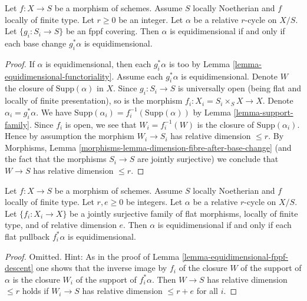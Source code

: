 \begin{lemma}
\label{lemma-equidimensional-fppf-descent}
Let $f : X \to S$ be a morphism of schemes. Assume $S$ locally Noetherian
and $f$ locally of finite type. Let $r \geq 0$ be an integer. Let $\alpha$
be a relative $r$-cycle on $X/S$. Let $\{g_i : S_i \to S\}$
be an fppf covering. Then $\alpha$ is equidimensional
if and only if each base change $g_i^*\alpha$ is equidimensional.
\end{lemma}

\begin{proof}
If $\alpha$ is equidimensional, then each $g_i^*\alpha$ is too by
Lemma \ref{lemma-equidimensional-functoriality}. Assume each $g_i^*\alpha$
is equidimensional. Denote $W$ the closure
of $\text{Supp}(\alpha)$ in $X$. Since $g_i : S_i \to S$ is universally open
(being flat and locally of finite presentation), so is the morphism
$f_i : X_i = S_i \times_S X \to X$. Denote $\alpha_i = g_i^*\alpha$. We have
$\text{Supp}(\alpha_i) = f_i^{-1}(\text{Supp}(\alpha))$ by
Lemma \ref{lemma-support-family}.
Since $f_i$ is open, we see that $W_i = f_i^{-1}(W)$ is the closure
of $\text{Supp}(\alpha_i)$. Hence by assumption the morphism
$W_i \to S_i$ has relative dimension $\leq r$.
By Morphisms, Lemma \ref{morphisms-lemma-dimension-fibre-after-base-change}
(and the fact that the morphisms $S_i \to S$ are jointly surjective)
we conclude that $W \to S$ has relative dimension $\leq r$.
\end{proof}

\begin{lemma}
\label{lemma-equidimensional-descent-pullbacks}
Let $f : X \to S$ be a morphism of schemes. Assume $S$ locally Noetherian
and $f$ locally of finite type. Let $r, e \geq 0$ be integers.
Let $\alpha$ be a relative $r$-cycle on $X/S$.
Let $\{f_i : X_i \to X\}$ be a jointly surjective family
of flat morphisms, locally of finite type, and of relative dimension $e$.
Then $\alpha$ is equidimensional if and only if each flat
pullback $f_i^*\alpha$ is equidimensional.
\end{lemma}

\begin{proof}
Omitted. Hint: As in the proof of Lemma \ref{lemma-equidimensional-fppf-descent}
one shows that the inverse image by $f_i$ of the closure $W$ of the support of
$\alpha$ is the closure $W_i$ of the support of $f_i^*\alpha$. Then
$W \to S$ has relative dimension $\leq r$ holds if $W_i \to S$
has relative dimension $\leq r + e$ for all $i$.
\end{proof}





